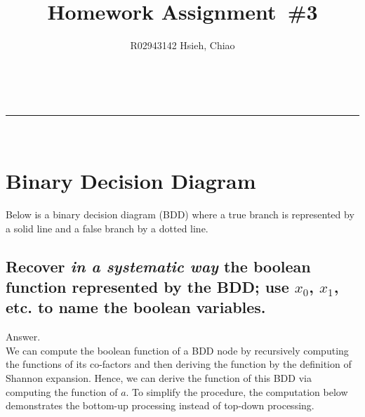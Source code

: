 \documentclass[a4paper,11pt]{article}
\makeatletter
\newcommand{\linia}{\rule{\linewidth}{0.5pt}}
\theoremstyle{mytheor}
\renewcommand{\maketitle}{
\begin{center}
\vspace{2ex}
{\huge \textsc{\@title}}
\vspace{1ex}
\\
\linia\\
\@author \hfill \@date
\vspace{4ex}
\end{center}
}
\makeatother
\begin{document}
\title{Homework Assignment~\#3}

\author{R02943142 Hsieh, Chiao}

\maketitle

\section{Binary Decision Diagram}
Below is a binary decision diagram (BDD) where a true branch is represented by a solid line and a false branch by a dotted line.

\begin{center}
\end{center}

\subsection{Recover \textit{in a systematic way} the boolean function represented by the BDD; use $x_0$, $x_1$, etc. to name the boolean variables.}

Answer.
\smallskip \\
We can compute the boolean function of a BDD node by recursively computing the functions of its co-factors and then deriving the function by the definition of  Shannon expansion.
Hence, we can derive the function of this BDD via computing the function of $a$. To simplify the procedure, the computation below demonstrates the bottom-up processing instead of top-down processing. 
\end{document}
